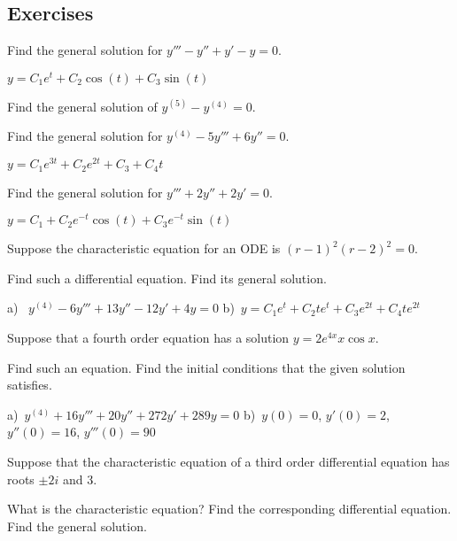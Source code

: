 \subsection{Exercises}

\begin{exercise}
Find the general solution for $y''' - y'' + y' - y = 0$.
\end{exercise}
\comboSol{%
}
{%
$y = C_1e^t + C_2\cos(t) + C_3\sin(t)$
}

\begin{exercise}\ansMark%
Find the general solution of $y^{(5)}-y^{(4)}=0$.
\end{exercise}

\begin{exercise}
Find the general solution for $y^{(4)} - 5 y''' + 6 y'' = 0$.
\end{exercise}
\comboSol{%
}
{%
$y = C_1e^{3t} + C_2e^{2t} + C_3 + C_4t$
}

\begin{exercise}
Find the general solution for $y''' + 2 y'' + 2 y' = 0$.
\end{exercise}
\comboSol{%
}
{%
$y = C_1 + C_2e^{-t}\cos(t) + C_3e^{-t}\sin(t)$
}

\begin{exercise}
Suppose the characteristic equation for an ODE is
${(r-1)}^2{(r-2)}^2 = 0$.
\begin{tasks}
\task
Find such a differential equation.
\task
Find its general solution.
\end{tasks}
\end{exercise}
\comboSol{%
}
{%
a)~ $y^{(4)} - 6y''' + 13y'' - 12y' + 4y = 0$ \quad b)~$y = C_1e^t + C_2te^t + C_3e^{2t} + C_4te^{2t}$
}

\begin{exercise} \label{hol:eqfromsolex}
Suppose that a fourth order equation has a solution
$y = 2 e^{4x} x \cos x$.  
\begin{tasks}
\task
Find such an equation.
\task
Find the initial conditions that the given
solution satisfies.
\end{tasks}
\end{exercise}
\comboSol{%
}
{%
a)~$y^{(4)} + 16y''' + 20y'' + 272y' + 289y = 0$ \quad b)~$y(0) = 0$, $y'(0) = 2$, $y''(0) = 16$, $y'''(0) = 90$
}

\begin{exercise}\ansMark
\pagebreak[2]
Suppose that the characteristic equation of a third order differential
equation has
roots $\pm 2i$ and 3.
\begin{tasks}
\task
What is the characteristic equation?
\task
Find the
corresponding differential equation.
\task
Find the general solution.
\end{tasks}
\end{exercise}


